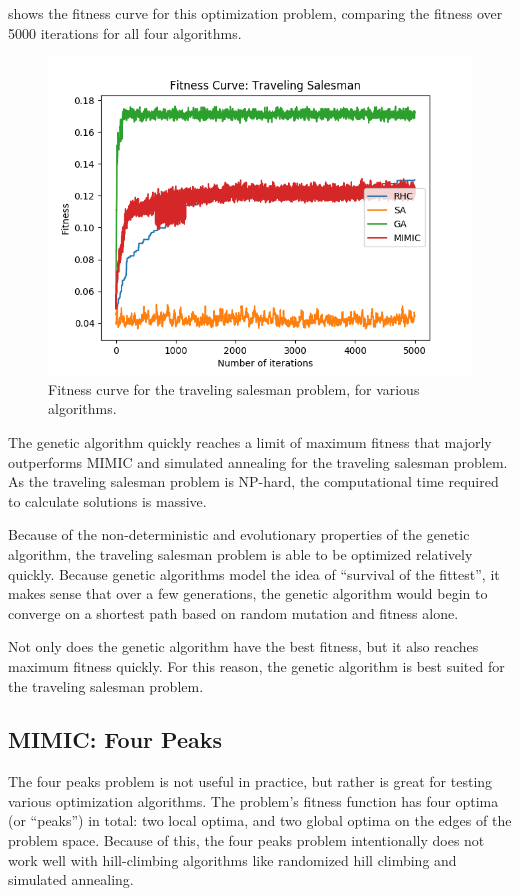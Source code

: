 \documentclass{article}
\begin{document}
       shows the fitness curve for this optimization problem, comparing the fitness over 5000 iterations for all four algorithms.

      \begin{figure}[htb]
      \centering
      \includegraphics[width=.5\linewidth]{out/op/salesman/fitness.png}
      \caption{Fitness curve for the traveling salesman problem, for various algorithms.}
      \label{fig:fitness-ts}
      \end{figure}

      The genetic algorithm quickly reaches a limit of maximum fitness that majorly outperforms MIMIC and simulated annealing for the traveling salesman problem. As the traveling salesman problem is NP-hard, the computational time required to calculate solutions is massive.

      Because of the non-deterministic and evolutionary properties of the genetic algorithm, the traveling salesman problem is able to be optimized relatively quickly. Because genetic algorithms model the idea of ``survival of the fittest'', it makes sense that over a few generations, the genetic algorithm would begin to converge on a shortest path based on random mutation and fitness alone.

      Not only does the genetic algorithm have the best fitness, but it also reaches maximum fitness quickly. For this reason, the genetic algorithm is best suited for the traveling salesman problem.

    \subsection{MIMIC: Four Peaks}
      The four peaks problem is not useful in practice, but rather is great for testing various optimization algorithms. The problem's fitness function has four optima (or ``peaks'') in total: two local optima, and two global optima on the edges of the problem space. Because of this, the four peaks problem intentionally does not work well with hill-climbing algorithms like randomized hill climbing and simulated annealing.
\end{document}
